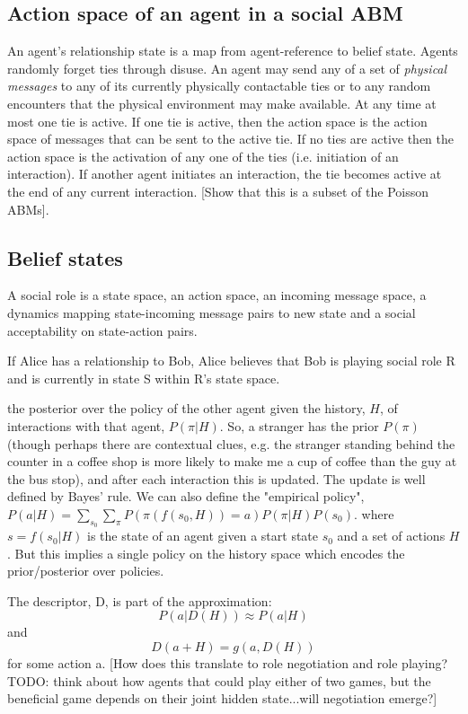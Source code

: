 \documentclass[a4paper]{article}
\begin{document}
\subsection{Action space of an agent in a social ABM}

An agent's relationship state is a map from agent-reference to belief state. Agents randomly forget ties through disuse. An agent may send any of a set of \textit{physical messages} to any of its currently physically contactable ties or to any random encounters that the physical environment may make available. At any time at most one tie is active. If one tie is active, then the action space is the action space of messages that can be sent to the active tie. If no ties are active then the action space is the activation of any one of the ties (i.e. initiation of an interaction). If another agent initiates an interaction, the tie becomes active at the end of any current interaction. [Show that this is a subset of the Poisson ABMs].

\subsection{Belief states}

A social role is a state space, an action space, an incoming message space, a dynamics mapping state-incoming message pairs to new state and a social acceptability on state-action pairs.

If Alice has a relationship to Bob, Alice believes that Bob is playing social role R and is currently in state S within R's state space.

 the posterior over the policy of the other agent given the history, $H$, of interactions with that agent, $P(\pi|H)$. So, a stranger has the prior $P(\pi)$ (though perhaps there are contextual clues, e.g. the stranger standing behind the counter in a coffee shop is more likely to make me a cup of coffee than the guy at the bus stop), and after each interaction this is updated. The update is well defined by Bayes' rule. We can also define the "empirical policy", $P(a|H) = \sum_{s_0}\sum_\pi P(\pi(f(s_0,H))=a)P(\pi|H)P(s_0)$. where $s=f(s_0|H)$ is the state of an agent given a start state $s_0$ and a set of actions $H$. But this implies a single policy on the history space which encodes the prior/posterior over policies.

The descriptor, D, is part of the approximation:
\[P(a|D(H)) \approx P(a|H)
\]
and
\[D(a+H) = g(a,D(H))\]
for some action a. [How does this translate to role negotiation and role playing? TODO: think about how agents that could play either of two games, but the beneficial game depends on their joint hidden state...will negotiation emerge?]
\end{document}
